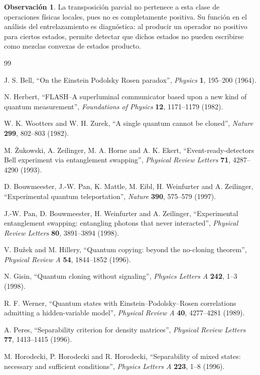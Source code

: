 \documentclass[12pt,a4paper]{article}
\theoremstyle{definition}
\newtheorem{observacion}[definicion]{Observación}
\theoremstyle{plain}
\theoremstyle{remark}
\begin{document}
\begin{observacion}
La transposición parcial no pertenece a esta clase de operaciones físicas locales, pues no es completamente positiva. Su función en el análisis del entrelazamiento es diagnóstica: al producir un operador no positivo para ciertos estados, permite detectar que dichos estados no pueden escribirse como mezclas convexas de estados producto.
\end{observacion}


\begin{thebibliography}{99}

J. S. Bell, ``On the Einstein Podolsky Rosen paradox'', \emph{Physics} \textbf{1}, 195--200 (1964).

N. Herbert, ``FLASH--A superluminal communicator based upon a new kind of quantum measurement'', \emph{Foundations of Physics} \textbf{12}, 1171--1179 (1982).

W. K. Wootters and W. H. Zurek, ``A single quantum cannot be cloned'', \emph{Nature} \textbf{299}, 802--803 (1982).

M. {\.Z}ukowski, A. Zeilinger, M. A. Horne and A. K. Ekert, ``Event-ready-detectors Bell experiment via entanglement swapping'', \emph{Physical Review Letters} \textbf{71}, 4287--4290 (1993).

D. Bouwmeester, J.-W. Pan, K. Mattle, M. Eibl, H. Weinfurter and A. Zeilinger, ``Experimental quantum teleportation'', \emph{Nature} \textbf{390}, 575--579 (1997).

J.-W. Pan, D. Bouwmeester, H. Weinfurter and A. Zeilinger, ``Experimental entanglement swapping: entangling photons that never interacted'', \emph{Physical Review Letters} \textbf{80}, 3891--3894 (1998).

V. Bu{\v z}ek and M. Hillery, ``Quantum copying: beyond the no-cloning theorem'', \emph{Physical Review A} \textbf{54}, 1844--1852 (1996).

N. Gisin, ``Quantum cloning without signaling'', \emph{Physics Letters A} \textbf{242}, 1--3 (1998).


R. F. Werner, ``Quantum states with Einstein--Podolsky--Rosen correlations admitting a hidden-variable model'', \emph{Physical Review A} \textbf{40}, 4277--4281 (1989).

A. Peres, ``Separability criterion for density matrices'', \emph{Physical Review Letters} \textbf{77}, 1413--1415 (1996).

M. Horodecki, P. Horodecki and R. Horodecki, ``Separability of mixed states: necessary and sufficient conditions'', \emph{Physics Letters A} \textbf{223}, 1--8 (1996).

\end{thebibliography}
\end{document}
